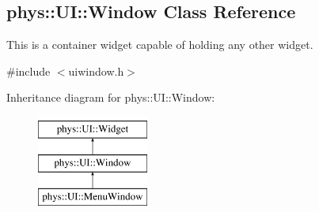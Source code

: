 \hypertarget{classphys_1_1UI_1_1Window}{
\subsection{phys::UI::Window Class Reference}
\label{classphys_1_1UI_1_1Window}
}


This is a container widget capable of holding any other widget.  




{\ttfamily \#include $<$uiwindow.h$>$}

Inheritance diagram for phys::UI::Window:\begin{figure}[H]
\begin{center}
\leavevmode
\includegraphics[height=3.000000cm]{classphys_1_1UI_1_1Window}
\end{center}
\end{figure}

